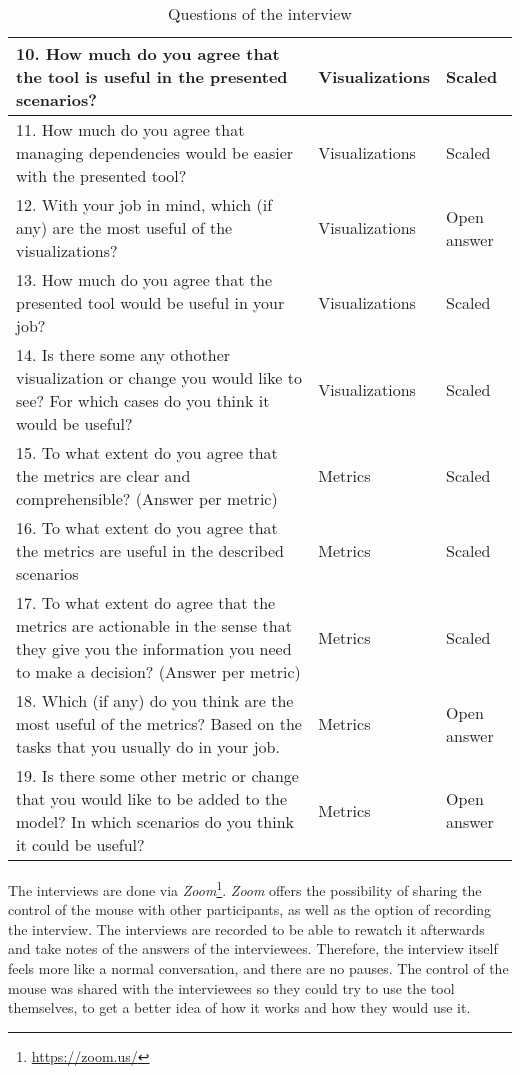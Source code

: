 \begin{table}[p]
\begin{center}
\begin{tabularx}{\textwidth}{|X|l|l|}
    \hline
    10.	How much do you agree that the tool is useful in the presented scenarios? & Visualizations & Scaled \\\hline
    11.	How much do you agree that managing dependencies would be easier with the presented tool? & Visualizations & Scaled \\\hline
    12.	With your job in mind, which (if any) are the most useful of the visualizations? & Visualizations & Open answer \\\hline
    13.	How much do you agree that the presented tool would be useful in your job? & Visualizations & Scaled \\\hline
    14.	Is there some any othother visualization or change you would like to see? For which cases do you think it would be useful? & Visualizations & Scaled \\\hline
    \hline
    15.	To what extent do you agree that the metrics are clear and comprehensible? (Answer per metric) & Metrics & Scaled \\\hline
    16.	To what extent do you agree that the metrics are useful in the described scenarios & Metrics & Scaled \\\hline
    17.	To what extent do agree that the metrics are actionable in the sense that they give you the information you need to make a decision? (Answer per metric) & Metrics & Scaled \\\hline
    18.	Which (if any) do you think are the most useful of the metrics? Based on the tasks that you usually do in your job. & Metrics & Open answer \\\hline
    19.	Is there some other metric or change that you would like to be added to the model? In which scenarios do you think it could be useful? & Metrics & Open answer \\\hline
    \end{tabularx}
    \end{center}
    \caption{Questions of the interview}
    \label{table:interview-questions}
\end{table}

The interviews are done via \textit{Zoom}\footnote{\url{https://zoom.us/}}. \textit{Zoom} offers the possibility of sharing the control of the mouse with other participants, as well as the option of recording the interview. The interviews are recorded to be able to rewatch it afterwards and take notes of the answers of the interviewees. Therefore, the interview itself feels more like a normal conversation, and there are no pauses. The control of the mouse was shared with the interviewees so they could try to use the tool themselves, to get a better idea of how it works and how they would use it.

